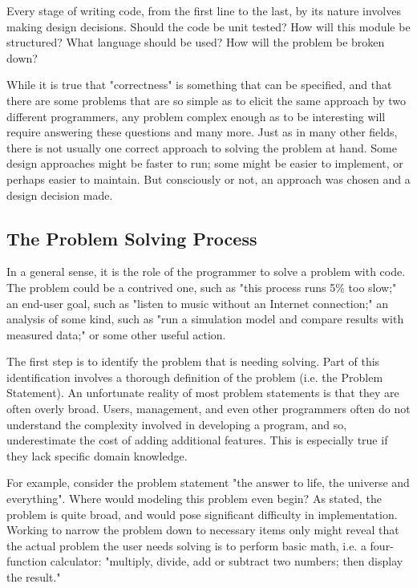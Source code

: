 \documentclass[../main.tex]{subfiles}
\begin{document}
Every stage of writing code, from the first line to the last, by its nature involves
making design decisions. Should the code be unit tested? How will this module be
structured? What language should be used? How will the problem be broken down?

While it is true that "correctness" is something that can be specified, and that 
there are some problems that are so simple as to elicit the same approach by two 
different programmers, any problem complex enough as to be interesting will require 
answering these questions and many more. Just as in many other fields, there is not 
usually one correct approach to solving the problem at hand. Some design approaches 
might be faster to run; some might be easier to implement, or perhaps easier to 
maintain. But consciously or not, an approach was chosen and a design decision made.

\subsection{The Problem Solving Process}
In a general sense, it is the role of the programmer to solve a problem with code.
The problem could be a contrived one, such as "this process runs 5\% too slow;" an
end-user goal, such as "listen to music without an Internet connection;"
an analysis of some kind, such as "run a simulation model and compare results with
measured data;" or some other useful action.

The first step is to identify the problem that is needing solving. Part of this 
identification involves a thorough definition of the problem (i.e. the Problem 
Statement). An unfortunate reality of most problem statements is that they are often
overly broad. Users, management, and even other programmers often do not understand 
the complexity involved in developing a program, and so, underestimate the cost of
adding additional features. This is especially true if they lack specific domain
knowledge.

For example, consider the problem statement "the answer to life, the
universe and everything". Where would modeling this problem even begin? As stated, 
the problem is quite broad, and would pose significant difficulty in implementation.
Working to narrow the problem down to necessary items only might reveal that the
actual problem the user needs solving is to perform basic math, i.e. a four-function 
calculator: "multiply, divide, add or subtract two numbers; then display the result."
\end{document}
